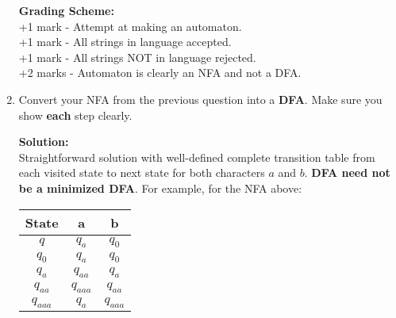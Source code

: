 \documentclass[11pt, article, oneside]{memoir}
\begin{document}
\begin{enumerate}
\begin{center}
        \end{center}

        \textbf{Grading Scheme:}
        \\+1 mark - Attempt at making an automaton.
        \\+1 mark - All strings in language accepted.
        \\+1 mark - All strings NOT in language rejected.
        \\+2 marks - Automaton is clearly an NFA and not a DFA.
        
    \item
        Convert your NFA from the previous question into a \textbf{DFA}. Make sure you show \textbf{each} step clearly.

        \textbf{Solution:}
        \\Straightforward solution with well-defined complete transition table from each visited state to next state for both characters \(a\) and \(b\). \textbf{DFA need not be a minimized DFA}. For example, for the NFA above:
        \begin{center}
        \begin{tabular}{|c|c|c|} 
            \hline
            State & a & b\\
            \hline
            \(q\) & \(q_{a}\) & \(q_{0}\)\\ 
            \hline
            \(q_0\) & \(q_{a}\) & \(q_{0}\)\\ 
            \hline
            \(q_{a}\) & \(q_{aa}\) & \(q_{a}\)\\ 
            \hline
            \(q_{aa}\) & \(q_{aaa}\) & \(q_{aa}\)\\ 
            \hline
            \(q_{aaa}\) & \(q_{a}\) & \(q_{aaa}\)\\ 
            \hline
        \end{tabular}
        \end{center}


\end{enumerate}
\end{document}
